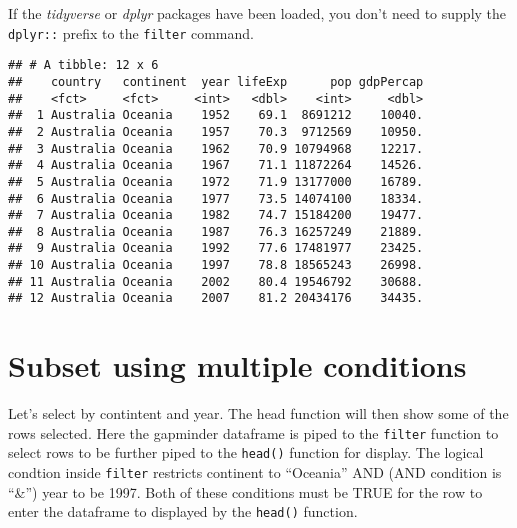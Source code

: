 \documentclass[]{book}
\newenvironment{Shaded}{\begin{snugshade}}{\end{snugshade}}
\newcommand{\KeywordTok}[1]{\textcolor[rgb]{0.13,0.29,0.53}{\textbf{#1}}}
\newcommand{\DataTypeTok}[1]{\textcolor[rgb]{0.13,0.29,0.53}{#1}}
\newcommand{\DecValTok}[1]{\textcolor[rgb]{0.00,0.00,0.81}{#1}}
\newcommand{\StringTok}[1]{\textcolor[rgb]{0.31,0.60,0.02}{#1}}
\newcommand{\CommentTok}[1]{\textcolor[rgb]{0.56,0.35,0.01}{\textit{#1}}}
\newcommand{\OperatorTok}[1]{\textcolor[rgb]{0.81,0.36,0.00}{\textbf{#1}}}
\newcommand{\NormalTok}[1]{#1}
\begin{document}
If the \emph{tidyverse} or \emph{dplyr} packages have been loaded, you
don't need to supply the \texttt{dplyr::} prefix to the \texttt{filter}
command.

\begin{Shaded}
\end{Shaded}

\begin{verbatim}
## # A tibble: 12 x 6
##    country   continent  year lifeExp      pop gdpPercap
##    <fct>     <fct>     <int>   <dbl>    <int>     <dbl>
##  1 Australia Oceania    1952    69.1  8691212    10040.
##  2 Australia Oceania    1957    70.3  9712569    10950.
##  3 Australia Oceania    1962    70.9 10794968    12217.
##  4 Australia Oceania    1967    71.1 11872264    14526.
##  5 Australia Oceania    1972    71.9 13177000    16789.
##  6 Australia Oceania    1977    73.5 14074100    18334.
##  7 Australia Oceania    1982    74.7 15184200    19477.
##  8 Australia Oceania    1987    76.3 16257249    21889.
##  9 Australia Oceania    1992    77.6 17481977    23425.
## 10 Australia Oceania    1997    78.8 18565243    26998.
## 11 Australia Oceania    2002    80.4 19546792    30688.
## 12 Australia Oceania    2007    81.2 20434176    34435.
\end{verbatim}

\section{Subset using multiple
conditions}\label{subset-using-multiple-conditions}

Let's select by contintent and year. The head function will then show
some of the rows selected. Here the gapminder dataframe is piped to the
\texttt{filter} function to select rows to be further piped to the
\texttt{head()} function for display. The logical condtion inside
\texttt{filter} restricts continent to ``Oceania'' AND (AND condition is
``\&'') year to be 1997. Both of these conditions must be TRUE for the
row to enter the dataframe to displayed by the \texttt{head()} function.
\end{document}
